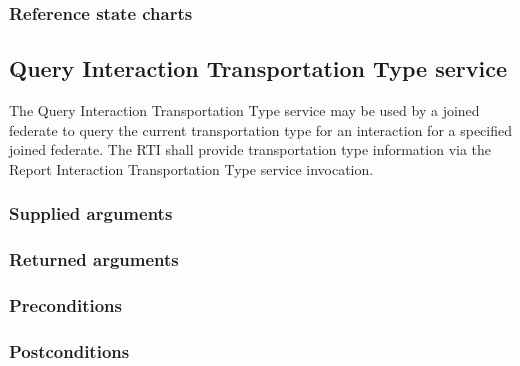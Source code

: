 \begin{compactstdpage}

    \subsubsection{Reference state charts}



    \subsection{Query Interaction Transportation Type service}


    The Query Interaction Transportation Type service may be used by a joined federate to query the current transportation type for an interaction for a specified joined federate. The RTI shall provide transportation type information via the Report Interaction Transportation Type \rtiinitiated{} service invocation.

    \subsubsection{Supplied arguments}



    \subsubsection{Returned arguments}



    \subsubsection{Preconditions}



    \subsubsection{Postconditions}



\end{compactstdpage}

